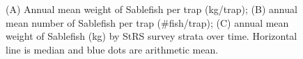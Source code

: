 \documentclass[12pt]{article}\usepackage[]{graphicx}\usepackage[]{color}
\begin{document}
\begin{figure}[htb]

{\centering {} 

}

\caption{(A) Annual mean weight of Sablefish per trap (kg/trap); (B) annual mean number of Sablefish per trap (\#fish/trap); (C) annual mean weight of Sablefish (kg) by StRS survey strata over time. Horizontal line is median and blue dots are arithmetic mean.}\label{fig:figure10}
\end{figure}
\clearpage
\end{document}
